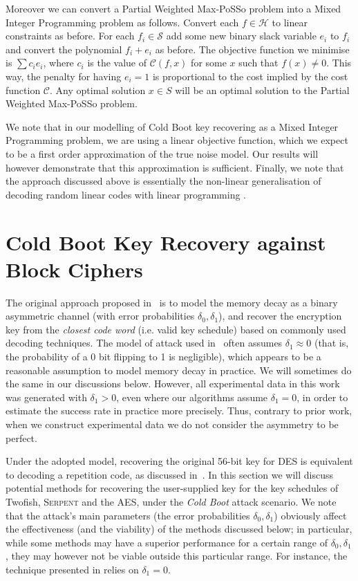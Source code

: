 \documentclass{llncs}
\newcommand{\Ss}{\ensuremath{\mathcal{S}}}
\newcommand{\Hs}{\ensuremath{\mathcal{H}}}
\newcommand{\Serpent}{\textsc{Serpent}\xspace}
\newcommand{\coldboot}{\emph{Cold Boot}\xspace}
\begin{document}
Moreover we can convert a Partial Weighted Max-PoSSo problem into a Mixed Integer Programming problem as follows.
Convert each $f \in \Hs$ to linear constraints as before. For each $f_i \in \Ss$ add some new binary slack variable $e_i$ to $f_i$ and convert the polynomial $f_i + e_i$ as before.  The objective function we minimise is $\sum c_i e_i$, where $c_i$ is the value of $\mathcal{C}(f,x)$ for some $x$ such that $f(x) \neq 0$. This way, the penalty for having $e_i=1$ is proportional to the cost implied by the cost function $\mathcal{C}$. Any optimal solution $x \in S$ will be an optimal solution to the Partial Weighted Max-PoSSo problem.


We note that in our modelling of Cold Boot key recovering as a Mixed Integer Programming problem, we are using a linear objective function, 
which we expect to be a first order approximation of the true noise model. Our results will however demonstrate that this approximation is sufficient.
Finally, we note that the approach discussed above is essentially the non-linear generalisation of decoding random linear codes with linear programming \cite{feldman:phd}.


\section{Cold Boot Key Recovery against Block Ciphers}
\label{sec:keyrecovery}

The original approach proposed in~\cite{coldboot} is to model the memory decay as a binary asymmetric channel (with error probabilities $\delta_0, \delta_1$), 
and recover the encryption key from the \emph{closest code word} (i.e. valid key schedule) based on commonly used decoding techniques. The model of attack used in~\cite{coldboot} often assumes $\delta_1 \approx 0$  (that is, the probability of a 0 bit flipping to 1 is negligible), which appears to be a reasonable assumption to model memory decay in practice. We will sometimes do the same in our discussions below. However, all experimental data in this work was generated with $\delta_1 > 0$, even where our algorithms assume $\delta_1 = 0$, in order to estimate the success rate in practice more precisely. Thus, contrary to prior work, when we construct experimental data we do not consider the asymmetry to be perfect.

Under the adopted model, recovering the original 56-bit key for DES is equivalent to decoding a repetition code, as discussed in~\cite{coldboot}. 
In this section we will discuss potential methods for recovering the user-supplied key for the key schedules of Twofish, \Serpent and the AES, under the \coldboot attack scenario. We note that the attack's main parameters (the error probabilities $\delta_0, \delta_1$) obviously affect the effectiveness (and the viability) of the methods discussed below; in particular, while some methods may have a superior performance for a certain range of $\delta_0, \delta_1$, they may however not be viable outside this particular range. For instance, the technique presented in \cite{aes-sat} relies on $\delta_1 = 0$.
\end{document}

